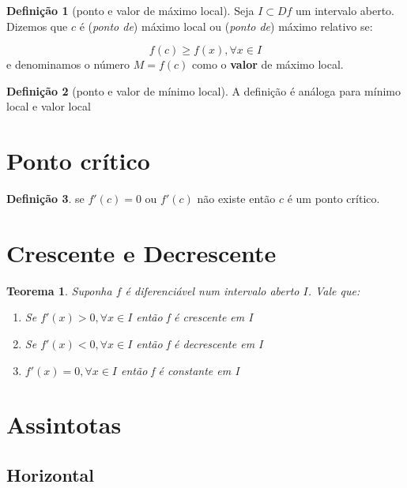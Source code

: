 \documentclass[14pt]{extreport}
\newtheorem{theorem}{Teorema}
\theoremstyle{definition}
\newtheorem{definition}{Definição}
\begin{document}
\begin{definition}[ponto e valor de máximo local]
    Seja \(I \subset Df\) um intervalo aberto. Dizemos que \(c\) é (\textit{ponto de}) máximo local ou (\textit{ponto de}) máximo relativo se:
    
    \begin{equation}
        f(c) \geq f(x), \forall x \in I
    \end{equation}
    e denominamos o número \(M = f(c)\) como o \textbf{valor} de máximo local.
\end{definition}

\begin{definition}[ponto e valor de mínimo local]
    A definição é análoga para mínimo local e valor local
\end{definition}

\section{Ponto crítico}

\begin{definition}
    se \(f'(c) = 0\) ou \(f'(c)\) não existe então \(c\) é um ponto crítico.
\end{definition}

\section{Crescente e Decrescente}

\begin{theorem}
    Suponha \(f\) é diferenciável num intervalo aberto \(I\). Vale que:
    \begin{enumerate}
        \item Se \(f'(x) > 0, \forall x  \in I\) então f é crescente em I
        \item Se \(f'(x) < 0, \forall x  \in I\) então f é decrescente em I
        \item \(f'(x) = 0, \forall x  \in I\) então f é constante em I
    \end{enumerate}
\end{theorem}

\section{Assintotas}

\subsection{Horizontal}
\end{document}
